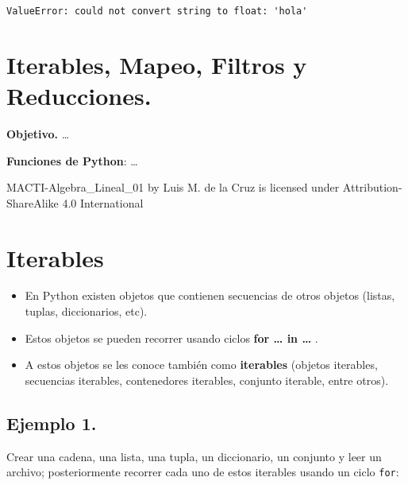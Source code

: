 \documentclass[
  letterpaper,
  DIV=11,
  numbers=noendperiod]{scrreprt}
\providecommand{\tightlist}{%
  \setlength{\itemsep}{0pt}\setlength{\parskip}{0pt}}\usepackage{longtable,booktabs,array}
\begin{document}
\begin{verbatim}
ValueError: could not convert string to float: 'hola'
\end{verbatim}


\chapter{Iterables, Mapeo, Filtros y
Reducciones.}\label{iterables-mapeo-filtros-y-reducciones.}

\textbf{Objetivo.} \ldots{}

\textbf{Funciones de Python}: \ldots{}

MACTI-Algebra\_Lineal\_01 by Luis M. de la Cruz is licensed under
Attribution-ShareAlike 4.0 International


\chapter{Iterables}\label{iterables}

\begin{itemize}
\tightlist
\item
  En Python existen objetos que contienen secuencias de otros objetos
  (listas, tuplas, diccionarios, etc).
\item
  Estos objetos se pueden recorrer usando ciclos \textbf{for \ldots{} in
  \ldots{}} .
\item
  A estos objetos se les conoce también como \textbf{iterables} (objetos
  iterables, secuencias iterables, contenedores iterables, conjunto
  iterable, entre otros).
\end{itemize}

\section{\texorpdfstring{\textbf{Ejemplo
1.}}{Ejemplo 1.}}\label{ejemplo-1.-3}

Crear una cadena, una lista, una tupla, un diccionario, un conjunto y
leer un archivo; posteriormente recorrer cada uno de estos iterables
usando un ciclo \texttt{for}:
\end{document}
